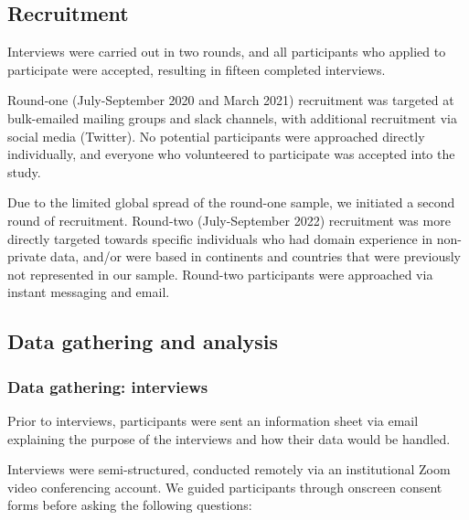 \documentclass{CUP-JNL-DAP}%
\begin{document}
\subsection{Recruitment}
Interviews were carried out in two rounds, and all participants who applied to participate were accepted, resulting in fifteen completed interviews. 

Round-one (July-September 2020 and March 2021) recruitment was targeted at bulk-emailed mailing groups and slack channels, with additional recruitment via social media (Twitter). No potential participants were approached directly individually, and everyone who volunteered to participate was accepted into the study.  

Due to the limited global spread of the round-one sample, we initiated a second round of recruitment. Round-two (July-September 2022) recruitment was more directly targeted towards specific individuals who had domain experience in non-private data, and/or were based in continents and countries that were previously not represented in our sample. Round-two participants were approached via instant messaging and email. 

\subsection{Data gathering and analysis}

\subsubsection{Data gathering: interviews}
Prior to interviews, participants were sent an information sheet via email explaining the purpose of the interviews and how their data would be handled. 

Interviews were semi-structured, conducted remotely via an institutional Zoom video conferencing account. We guided participants through onscreen consent forms  before asking the following questions: 
\end{document}
